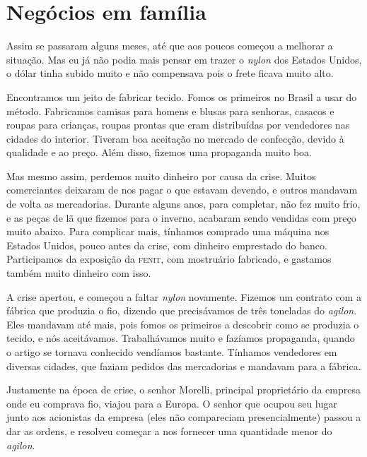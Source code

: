 \chapter{Negócios em família}

Assim se passaram alguns meses, até que aos poucos começou a melhorar a
situação. Mas eu já não podia mais pensar em trazer o \textit{nylon} dos Estados
Unidos, o dólar tinha subido muito e não compensava pois o frete 
ficava muito alto.


Encontramos um jeito de fabricar tecido. Fomos os primeiros no Brasil a usar do método. Fabricamos camisas para homens e blusas para
senhoras, casacos e roupas para crianças, roupas prontas que eram
distribuídas por vendedores nas cidades do interior. Tiveram boa
aceitação no mercado de confecção, devido à qualidade e ao preço. Além
disso, fizemos uma propaganda muito boa.

Mas mesmo assim, perdemos muito dinheiro por causa da
crise. Muitos comerciantes deixaram de nos pagar o que estavam devendo, e
outros mandavam de volta as mercadorias. Durante alguns anos, para
completar, não fez muito frio, e as peças de lã que fizemos para o
inverno, acabaram sendo vendidas com preço muito abaixo. Para complicar mais, tínhamos comprado uma máquina nos Estados Unidos,
pouco antes da crise, com dinheiro emprestado do banco. Participamos da exposição da \textsc{fenit}, com mostruário fabricado, e gastamos também muito dinheiro com isso.

A crise apertou, e começou a faltar \textit{nylon} novamente. Fizemos um
contrato com a fábrica que produzia o fio, dizendo que precisávamos
de três toneladas do \textit{agilon}. Eles mandavam até mais, pois fomos os primeiros a descobrir como se produzia o tecido, e nós aceitávamos. Trabalhávamos muito e fazíamos propaganda, quando o
artigo se tornava conhecido vendíamos bastante. Tínhamos vendedores em diversas
cidades, que faziam pedidos das mercadorias e mandavam para a fábrica.

Justamente na época de crise, o senhor Morelli, principal proprietário da empresa onde
eu comprava fio, viajou para a Europa. O senhor que
ocupou seu lugar junto aos acionistas da empresa (eles 
não compareciam presencialmente) passou a dar as ordens, e resolveu
começar a nos fornecer uma quantidade menor do \textit{agilon}. 

